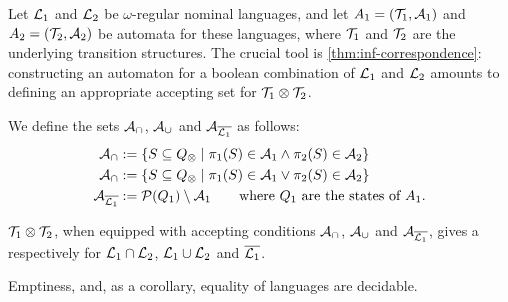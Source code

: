 \newcommand{\compl}[1]{\overline{#1}}
 

Let $\mathcal{L}_1$ and $\mathcal{L}_2$ be $\omega$-regular nominal languages, and let $A_1 = (\mathcal{T}_1,\mathcal{A}_1)$  and $A_2 = (\mathcal{T}_2,\mathcal{A}_2)$ be automata for these languages, where $\mathcal{T}_1$ and $\mathcal{T}_2$ are the underlying transition structures.
The crucial tool is \cref{thm:inf-correspondence}: constructing an automaton for a boolean combination of $\mathcal{L}_1$ and $\mathcal{L}_2$ amounts to defining an appropriate accepting set for $\mathcal{T}_1 \otimes \mathcal{T}_2$.

\begin{definition} We define the sets $\mathcal{A}_\cap$, $\mathcal{A}_\cup$ and $\acc_{\compl{\Lang_1}}$ as follows:
%
\begin{align*}
	\acc_\cap &:= \{ S \subseteq \syncQ \mid \pi_1(S) \in \acc_1 \land \pi_2(S) \in \acc_2 \} 
	\\
	\acc_\cap &:= \{ S \subseteq \syncQ \mid \pi_1(S) \in \acc_1 \lor \pi_2(S) \in \acc_2 \} 
	\\
	\acc_{\compl{\Lang_1}} &:= \Pow(Q_1) \setminus \acc_1 \qquad \text{where $Q_1$ are the states of $\autom_1$.}
\end{align*}
%
%
\end{definition}

\begin{theorem}
$\mathcal{T}_1 \otimes \mathcal{T}_2$, when equipped with accepting conditions $\mathcal{A}_\cap$, $\mathcal{A}_\cup$ and $\acc_{\compl{\Lang_1}}$, gives a \hdma{} respectively for $\mathcal{L}_1 \cap \mathcal{L}_2$, $\mathcal{L}_1 \cup \mathcal{L}_2$ and $\compl{\Lang_1}$.
\label{thm:bool-closure}
\end{theorem}
%
\begin{theorem}
\label{thm:decidable}
Emptiness, and, as a corollary, equality of languages are decidable.
\end{theorem}
